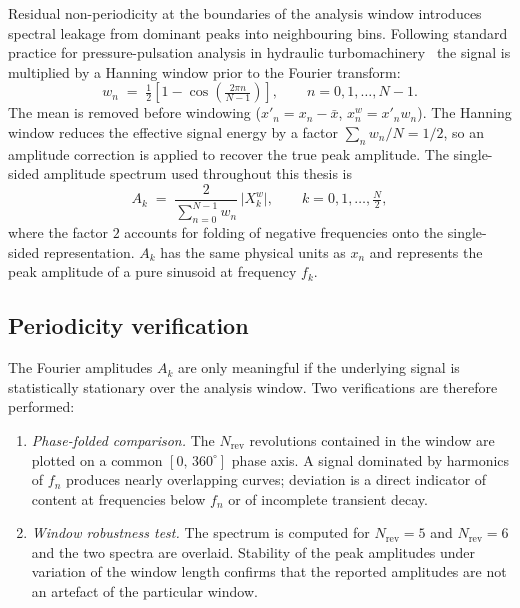 Residual non-periodicity at the boundaries of the analysis window
introduces spectral leakage from dominant peaks into neighbouring
bins. Following standard practice for pressure-pulsation analysis
in hydraulic turbomachinery~\cite{kerlef,bergan2018} the signal is
multiplied by a Hanning window prior to the Fourier transform:
\begin{equation}
    w_n \;=\; \tfrac{1}{2}\!\left[ 1 - \cos\!\left(\tfrac{2\pi n}{N-1}\right)\right],
    \qquad n = 0,1,\dots,N-1. \label{eq:hanning}
\end{equation}
The mean is removed before windowing ($x'_n = x_n - \bar{x}$,
$x^{w}_n = x'_n w_n$). The Hanning window reduces the effective
signal energy by a factor $\sum_n w_n / N = 1/2$, so an amplitude
correction is applied to recover the true peak amplitude. The
single-sided amplitude spectrum used throughout this thesis is
\begin{equation}
    A_k \;=\; \frac{2}{\displaystyle\sum_{n=0}^{N-1} w_n}\,
      \bigl|X^{w}_k\bigr|,
    \qquad k = 0,1,\dots,\tfrac{N}{2}, \label{eq:amplitude}
\end{equation}
where the factor $2$ accounts for folding of negative frequencies
onto the single-sided representation. $A_k$ has the same physical
units as $x_n$ and represents the peak amplitude of a pure sinusoid
at frequency $f_k$.

\subsection{Periodicity verification}
\label{sec:spec-periodicity}

The Fourier amplitudes $A_k$ are only meaningful if the underlying
signal is statistically stationary over the analysis window. Two
verifications are therefore performed:
\begin{enumerate}
  \item \emph{Phase-folded comparison.} The $N_{\mathrm{rev}}$
        revolutions contained in the window are plotted on a common
        $[0,\,360^\circ]$ phase axis. A signal dominated by harmonics
        of $f_n$ produces nearly overlapping curves; deviation is a
        direct indicator of content at frequencies below $f_n$ or of
        incomplete transient decay.
  \item \emph{Window robustness test.} The spectrum is computed for
        $N_{\mathrm{rev}} = 5$ and $N_{\mathrm{rev}} = 6$ and the
        two spectra are overlaid. Stability of the peak amplitudes
        under variation of the window length confirms that the
        reported amplitudes are not an artefact of the particular
        window.
\end{enumerate}

